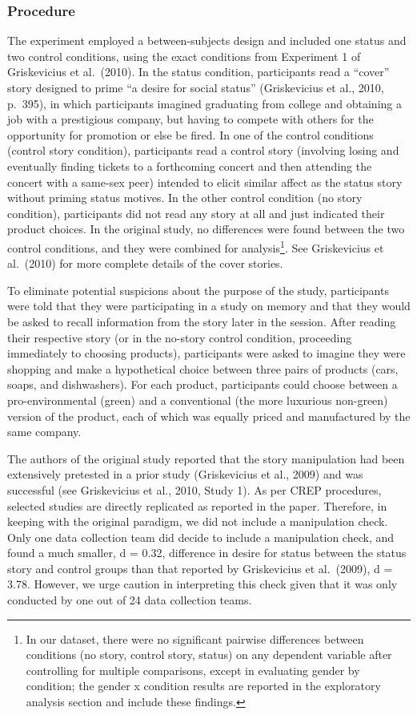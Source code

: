 \documentclass[
]{article}
\begin{document}
\subsubsection{Procedure}\label{procedure}

The experiment employed a between-subjects design and included one
status and two control conditions, using the exact conditions from
Experiment 1 of Griskevicius et al.~(2010). In the status condition,
participants read a ``cover'' story designed to prime ``a desire for
social status'' (Griskevicius et al., 2010, p.~395), in which
participants imagined graduating from college and obtaining a job with a
prestigious company, but having to compete with others for the
opportunity for promotion or else be fired. In one of the control
conditions (control story condition), participants read a control story
(involving losing and eventually finding tickets to a forthcoming
concert and then attending the concert with a same-sex peer) intended to
elicit similar affect as the status story without priming status
motives. In the other control condition (no story condition),
participants did not read any story at all and just indicated their
product choices. In the original study, no differences were found
between the two control conditions, and they were combined for
analysis\footnote{In our dataset, there were no significant pairwise
  differences between conditions (no story, control story, status) on
  any dependent variable after controlling for multiple comparisons,
  except in evaluating gender by condition; the gender x condition
  results are reported in the exploratory analysis section and include
  these findings.}. See Griskevicius et al.~(2010) for more complete
details of the cover stories.

To eliminate potential suspicions about the purpose of the study,
participants were told that they were participating in a study on memory
and that they would be asked to recall information from the story later
in the session. After reading their respective story (or in the no-story
control condition, proceeding immediately to choosing products),
participants were asked to imagine they were shopping and make a
hypothetical choice between three pairs of products (cars, soaps, and
dishwashers). For each product, participants could choose between a
pro-environmental (green) and a conventional (the more luxurious
non-green) version of the product, each of which was equally priced and
manufactured by the same company.

The authors of the original study reported that the story manipulation
had been extensively pretested in a prior study (Griskevicius et al.,
2009) and was successful (see Griskevicius et al., 2010, Study 1). As
per CREP procedures, selected studies are directly replicated as
reported in the paper. Therefore, in keeping with the original paradigm,
we did not include a manipulation check. Only one data collection team
did decide to include a manipulation check, and found a much smaller, d
= 0.32, difference in desire for status between the status story and
control groups than that reported by Griskevicius et al.~(2009), d =
3.78. However, we urge caution in interpreting this check given that it
was only conducted by one out of 24 data collection teams.
\end{document}
